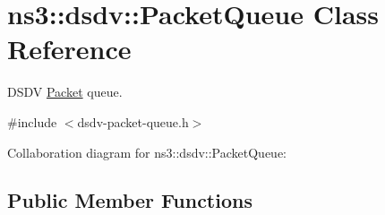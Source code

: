 \hypertarget{classns3_1_1dsdv_1_1PacketQueue}{}\section{ns3\+:\+:dsdv\+:\+:Packet\+Queue Class Reference}
\label{classns3_1_1dsdv_1_1PacketQueue}


D\+S\+DV \hyperlink{classns3_1_1Packet}{Packet} queue.  




{\ttfamily \#include $<$dsdv-\/packet-\/queue.\+h$>$}



Collaboration diagram for ns3\+:\+:dsdv\+:\+:Packet\+Queue\+:
\subsection*{Public Member Functions}
